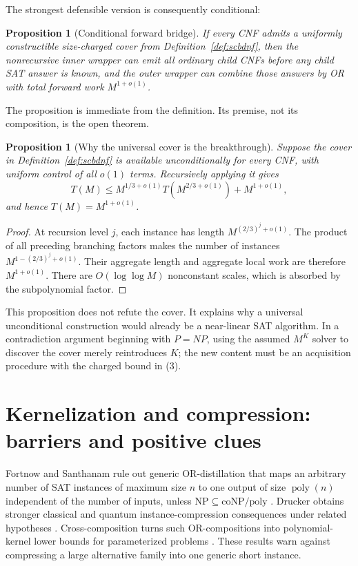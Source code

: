 \documentclass[11pt]{article}
\newtheorem{proposition}[theorem]{Proposition}
\newcommand{\poly}{\operatorname{poly}}
\begin{document}
The strongest defensible version is consequently conditional:
\begin{proposition}[Conditional forward bridge]\label{prop:bridge}
If every CNF admits a uniformly constructible size-charged cover from
Definition~\ref{def:scbdnf}, then the nonrecursive inner wrapper can emit all
ordinary child CNFs before any child SAT answer is known, and the outer
wrapper can combine those answers by OR with total forward work
$M^{1+o(1)}$.
\end{proposition}
The proposition is immediate from the definition.  Its premise, not its
composition, is the open theorem.

\begin{proposition}[Why the universal cover is the breakthrough]\label{prop:recurrence}
Suppose the cover in Definition~\ref{def:scbdnf} is available unconditionally
for every CNF, with uniform control of all $o(1)$ terms.  Recursively applying
it gives
\[
 T(M)\le M^{1/3+o(1)}T\!\left(M^{2/3+o(1)}\right)+M^{1+o(1)},
 \tag{R}
\]
and hence $T(M)=M^{1+o(1)}$.
\end{proposition}
\begin{proof}
At recursion level $j$, each instance has length
$M^{(2/3)^j+o(1)}$.  The product of all preceding branching factors makes
the number of instances $M^{1-(2/3)^j+o(1)}$.  Their aggregate length and
aggregate local work are therefore $M^{1+o(1)}$.  There are
$O(\log\log M)$ nonconstant scales, which is absorbed by the subpolynomial
factor.
\end{proof}

This proposition does not refute the cover.  It explains why a universal
unconditional construction would already be a near-linear SAT algorithm.
In a contradiction argument beginning with $P=NP$, using the assumed
$M^K$ solver to discover the cover merely reintroduces $K$; the new content
must be an acquisition procedure with the charged bound in (3).

\section{Kernelization and compression: barriers and positive clues}

Fortnow and Santhanam rule out generic OR-distillation that maps an arbitrary
number of SAT instances of maximum size $n$ to one output of size
$\poly(n)$ independent of the number of inputs, unless
$\mathrm{NP}\subseteq\mathrm{coNP/poly}$
\cite{fortnowsanthanam2011}.  Drucker obtains stronger classical and quantum
instance-compression consequences under related hypotheses
\cite{drucker2015}.  Cross-composition turns such OR-compositions into
polynomial-kernel lower bounds for parameterized problems
\cite{bodlaenderjansenkratsch2014}.  These results warn against compressing a
large alternative family into one generic short instance.
\end{document}
